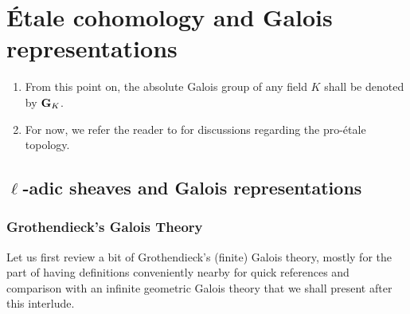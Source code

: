 \chapter{\'Etale cohomology and Galois representations} \label{chapter: etale_cohomology_2}
    \begin{abstract}
        
    \end{abstract}
    
    \minitoc
    
    \begin{convention}
        \noindent
        \begin{enumerate}
            \item From this point on, the absolute Galois group of any field $K$ shall be denoted by $\mathbf{G}_K$. 
            \item For now, we refer the reader to \cite[Definition 4.1.1 and Remark 4.1.3]{bhatt_scholze_2014_pro_etale} for discussions regarding the pro-\'etale topology.
        \end{enumerate}
    \end{convention}
    
    \section{\texorpdfstring{$\ell$}{}-adic sheaves and Galois representations} \label{section: l_adic_sheaves}
        \subsection{Grothendieck's Galois Theory} \label{subsection: grothendieck_galois_theory}
            Let us first review a bit of Grothendieck's (finite) Galois theory, mostly for the part of having definitions conveniently nearby for quick references and comparison with an infinite geometric Galois theory that we shall present after this interlude.
            
